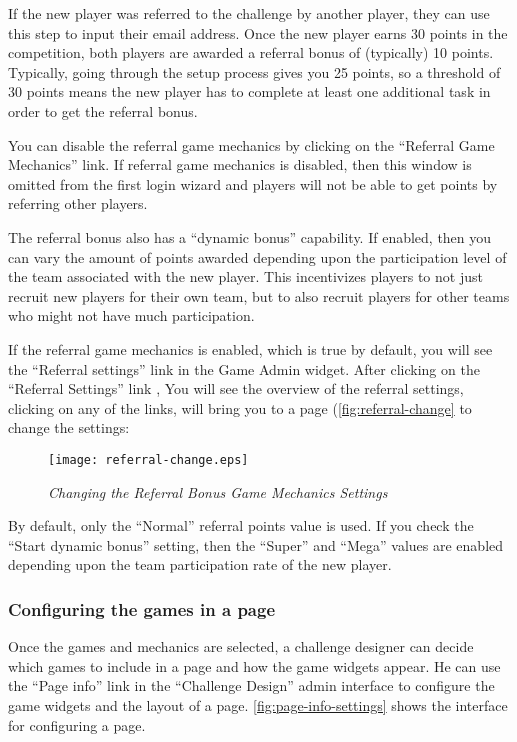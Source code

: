 If the new player was referred to the challenge by another player, they can use this step to input their email address. Once the new player earns 30 points in the competition, both players are awarded a referral bonus of (typically) 10 points. Typically, going through the setup process gives you 25 points, so a threshold of 30 points means the new player has to complete at least one additional task in order to get the referral bonus.

You can disable the referral game mechanics by clicking on the ``Referral Game Mechanics'' link. If referral game mechanics is disabled, then this window is omitted from the first login wizard and players will not be able to get points by referring other players.

The referral bonus also has a ``dynamic bonus'' capability. If enabled, then you can vary the amount of points awarded depending upon the participation level of the team associated with the new player. This incentivizes players to not just recruit new players for their own team, but to also recruit players for other teams who might not have much participation.

If the referral game mechanics is enabled, which is true by default, you will see the ``Referral settings'' link in the Game Admin widget. After clicking on the ``Referral Settings'' link , You will see the overview of the referral settings, clicking on any of the links, will bring you to a page (\autoref{fig:referral-change} to change the settings:

\begin{figure}[!ht]
  \center
  \texttt{[image: referral-change.eps]}
  \caption{\em Changing the Referral Bonus Game Mechanics Settings}
  \label{fig:referral-change}
\end{figure}

By default, only the ``Normal'' referral points value is used. If you check the ``Start dynamic bonus'' setting, then the ``Super'' and ``Mega'' values are enabled depending upon the team participation rate of the new player.

\subsubsection{Configuring the games in a page}
Once the games and mechanics are selected, a challenge designer can decide which games to include in a page and how the game widgets appear. He can use the ``Page info'' link in the ``Challenge Design'' admin interface to configure the game widgets and the layout of a page.  \autoref{fig:page-info-settings} shows the interface for configuring a page. 

